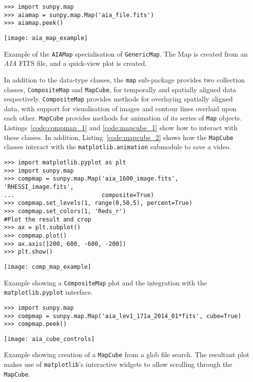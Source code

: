 \begin{listing}[H]
\begin{verbatim}
>>> import sunpy.map
>>> aiamap = sunpy.map.Map('aia_file.fits')
>>> aiamap.peek()
\end{verbatim}
\begin{center}
\texttt{[image: aia\_map\_example]}
\end{center}
\caption{Example of the \texttt{AIAMap} specialisation of 
\texttt{GenericMap}. The Map is created from an \textit{AIA} FITS file,
and a quick-view plot is created.}
\label{code:aia_1}
\end{listing}

In addition to the data-type classes, the \texttt{map} sub-package provides two 
collection classes, \texttt{CompositeMap} and \texttt{MapCube}, for 
temporally and spatially aligned data respectively.
\texttt{CompositeMap} provides methods for overlaying spatially aligned 
data, with support for visualisation of images and contour lines overlaid 
upon each other.
\texttt{MapCube} 
provides methods for animation of its series of \texttt{Map} objects. 
Listings~\ref{code:compmap_1} and \ref{code:mapcube_1} show how to interact 
with these classes.
In addition, Listing~\ref{code:mapcube_2} shows how the \texttt{MapCube} 
classes interact with the \texttt{matplotlib.animation} submodule to save a 
video.

\begin{listing}[H]
\begin{verbatim}
>>> import matplotlib.pyplot as plt
>>> import sunpy.map
>>> compmap = sunpy.map.Map('aia_1600_image.fits', 'RHESSI_image.fits', 
...                         composite=True)
>>> compmap.set_levels(1, range(0,50,5), percent=True)
>>> compmap.set_colors(1, 'Reds_r')
#Plot the result and crop
>>> ax = plt.subplot()
>>> compmap.plot()
>>> ax.axis([200, 600, -600, -200])
>>> plt.show()
\end{verbatim}
\begin{center}
\texttt{[image: comp\_map\_example]}
\end{center}
\caption{Example showing a \texttt{CompositeMap} plot and the integration with the \texttt{matplotlib.pyplot} interface.}
\label{code:compmap_1}
\end{listing}

\begin{listing}[H]
\begin{verbatim}
>>> import sunpy.map
>>> compmap = sunpy.map.Map('aia_lev1_171a_2014_01*fits', cube=True)
>>> compmap.peek()
\end{verbatim}
\begin{center}
\texttt{[image: aia\_cube\_controls]}
\end{center}
\caption{Example showing creation of a \texttt{MapCube} from a glob file search. The 
resultant plot makes use of \texttt{matplotlib}'s interactive widgets to allow scrolling 
through the \texttt{MapCube}.}
\label{code:mapcube_1}
\end{listing}

